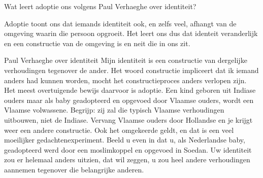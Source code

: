 \documentclass[main.tex]{subfiles}
\begin{document}
\begin{examenvraag}
    \begin{vraag}
        Wat leert adoptie ons volgens Paul Verhaeghe over identiteit?
    \end{vraag}

    \begin{antwoord}
        Adoptie toont ons dat iemands identiteit ook, en zelfs veel, afhangt van de omgeving waarin die persoon opgroeit. Het leert ons dus dat identeit veranderlijk en een constructie van de omgeving is en neit die in ons zit.
        \begin{citaat}{Paul Verhaeghe over identiteit}
            Mijn identiteit is een constructie van dergelijke verhoudingen tegenover de ander.
            Het woord constructie impliceert dat ik iemand anders had kunnen worden, mocht het constructieproces anders verlopen zijn.
            Het meest overtuigende bewijs daarvoor is adoptie.
            Een kind geboren uit Indiase ouders maar als baby geadopteerd en opgevoed door Vlaamse ouders, wordt een Vlaamse volwassene.
            Begrijp: zij zal die typisch Vlaamse verhoudingen uitbouwen, niet de Indiase.
            Vervang Vlaamse ouders door Hollandse en je krijgt weer een andere constructie.
            Ook het omgekeerde geldt, en dat is een veel moeilijker gedachtenexperiment.
            Beeld u even in dat u, als Nederlandse baby, geadopteerd werd door een moslimkoppel en opgevoed in Soedan. 
            Uw identiteit zou er helemaal anders uitzien, dat wil zeggen, u zou heel andere verhoudingen aannemen tegenover die belangrijke anderen.
        \end{citaat}
    \end{antwoord}
\end{examenvraag}
\end{document}
